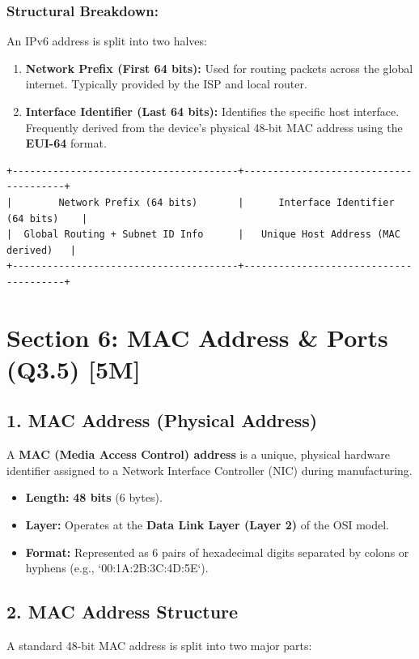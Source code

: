 \subsubsection{Structural Breakdown:}
An IPv6 address is split into two halves:
\begin{enumerate}
  \item \textbf{Network Prefix (First 64 bits):} Used for routing packets across the global internet. Typically provided by the ISP and local router.
  \item \textbf{Interface Identifier (Last 64 bits):} Identifies the specific host interface. Frequently derived from the device's physical 48-bit MAC address using the \textbf{EUI-64} format.
\end{enumerate}

\begin{lstlisting}
+---------------------------------------+---------------------------------------+
|        Network Prefix (64 bits)       |      Interface Identifier (64 bits)    |
|  Global Routing + Subnet ID Info      |   Unique Host Address (MAC derived)   |
+---------------------------------------+---------------------------------------+
\end{lstlisting}


\section{Section 6: MAC Address \& Ports (Q3.5) [5M]}

\subsection{1. MAC Address (Physical Address)}
A \textbf{MAC (Media Access Control) address} is a unique, physical hardware identifier assigned to a Network Interface Controller (NIC) during manufacturing.

\begin{itemize}
  \item   \textbf{Length:} \textbf{48 bits} (6 bytes).
  \item   \textbf{Layer:} Operates at the \textbf{Data Link Layer (Layer 2)} of the OSI model.
  \item   \textbf{Format:} Represented as 6 pairs of hexadecimal digits separated by colons or hyphens (e.g., `00:1A:2B:3C:4D:5E`).
\end{itemize}


\subsection{2. MAC Address Structure}
A standard 48-bit MAC address is split into two major parts:

